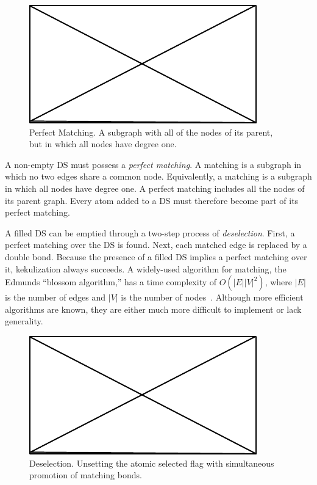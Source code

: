 \documentclass{article}
\begin{document}
\begin{figure}
    \centering
    \includegraphics{filler}
    \caption{Perfect Matching. A subgraph with all of the nodes of its parent, but in which all nodes have degree one.}
    \label{fig:perfect-matching}
\end{figure}

A non-empty DS must possess a \textit{perfect matching}. A matching is a subgraph in which no two edges share a common node. Equivalently, a matching is a subgraph in which all nodes have degree one. A perfect matching includes all the nodes of its parent graph. Every atom added to a DS must therefore become part of its perfect matching.

A filled DS can be emptied through a two-step process of \textit{deselection}. First, a perfect matching over the DS is found. Next, each matched edge is replaced by a double bond. Because the presence of a filled DS implies a perfect matching over it, kekulization always succeeds. A widely-used algorithm for matching, the Edmunds \enquote{blossom algorithm,} has a time complexity of $O(|E||V|^2)$, where $|E|$ is the number of edges and $|V|$ is the number of nodes~\cite{edmonds:1965}. Although more efficient algorithms are known, they are either much more difficult to implement or lack generality.

\begin{figure}
    \centering
    \includegraphics{filler}
    \caption{Deselection. Unsetting the atomic selected flag with simultaneous promotion of matching bonds.}
    \label{fig:deselection}
\end{figure}
\end{document}
